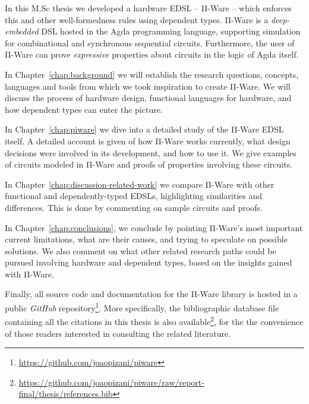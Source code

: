     In this M.Sc thesis we developed a hardware \ac{EDSL} – Π-Ware – which enforces this and other
    well-formedness rules using dependent types.
    Π-Ware is a \emph{deep-embedded} \ac{DSL} hosted in the Agda programming language,
    supporting simulation for combinational and synchronous sequential circuits.
    Furthermore, the user of Π-Ware can prove \emph{expressive} properties about circuits in the logic
    of Agda itself.

    In Chapter~\ref{chap:background} we will establish the research questions, concepts,
    languages and tools from which we took inspiration to create Π-Ware.
    We will discuss the process of hardware design, functional languages for hardware,
    and how dependent types can enter the picture.

    In Chapter~\ref{chap:piware} we dive into a detailed study of the Π-Ware \ac{EDSL} itself.
    A detailed account is given of how Π-Ware works currently,
    what design decisions were involved in its development, and how to use it.
    We give examples of circuits modeled in Π-Ware and proofs of properties involving these circuits.

    In Chapter~\ref{chap:discussion-related-work} we compare Π-Ware with other functional
    and dependently-typed \acp{EDSL}, highlighting similarities and differences.
    This is done by commenting on sample circuits and proofs.

    In Chapter~\ref{chap:conclusions}, we conclude by pointing Π-Ware's most important
    current limitations, what are their causes, and trying to speculate on possible solutions.
    We also comment on what other related research paths could be pursued involving
    hardware and dependent types, based on the insights gained with Π-Ware.

    Finally, all source code and documentation for the Π-Ware library is hosted in a public
    \emph{GitHub} repository\footnote{\url{https://github.com/joaopizani/piware}}. More specifically,
    the bibliographic database file containing all the citations in this thesis is also
    available\footnote{\url{https://github.com/joaopizani/piware/raw/report-final/thesis/references.bib}},
    for the the convenience of those readers interested in consulting the related literature.

